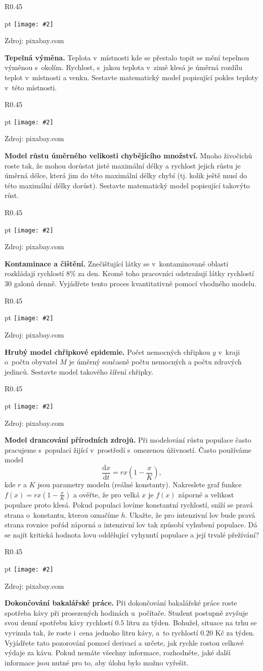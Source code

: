\documentclass{article}
\newcommand\obrazek[2][pixabay.com]{
  \clearpage
\begin{wrapfigure}{R}{0.45\linewidth}
  \begin{minipage}{1.0\linewidth}\parskip 0 pt
  \texttt{[image: \#2]}

  \vspace*{-10pt}
  \null\hfill{\color{gray}\footnotesize Zdroj: #1}
    
  \end{minipage}
\end{wrapfigure}
}
\let\oldtextbf\textbf
\def\textbf#1{%
  \oldtextbf{\color{red} #1}}
\begin{document}
\obrazek{room.jpg}
\textbf{Tepelná výměna.}  Teplota v místnosti kde se přestalo topit se mění
tepelnou výměnou s okolím. Rychlost, s jakou teplota v zimě klesá je
úměrná rozdílu teplot v místnosti a venku. Sestavte matematický model
popisující pokles teploty v této místnosti.


\obrazek{mladata.jpg}
\textbf{Model růstu úměrného velikosti chybějícího množství.}  Mnoho
živočichů roste tak, že mohou dorůstat jisté maximální délky a
rychlost jejich růstu je úměrná délce, která jim do této maximální
délky chybí (tj. kolik ještě musí do této maximální délky
dorůst). Sestavte matematický model popisující takovýto růst.


\obrazek{kontaminace.jpg}
\textbf{Kontaminace a čištění.}
Znečišťující látky se v kontaminované oblasti rozkládají rychlostí
$8\%$ za den. Kromě toho pracovníci odstraňují látky rychlostí $30$
galonů denně. Vyjádřete tento proces kvantitativně pomocí vhodného
modelu.

\obrazek{nemoc.jpg} \textbf{Hrubý model chřipkové epidemie.}  Počet
nemocných chřipkou $y$ v kraji o počtu obyvatel $M$ je úměrný současně
počtu nemocných a počtu zdravých jedinců. Sestavte model takového
šíření chřipky.


\obrazek{lov.jpg}
\textbf{Model drancování přírodních zdrojů.}
Při modelování růstu populace často pracujeme s populací žijící v prostředí s omezenou úživností. Často používáme model
$$\frac{\mathrm d x}{\mathrm dt}=rx\left(1-\frac xK\right),$$
kde $r$ a $K$ jsou parametry modelu (reálné konstanty).  Nakreslete
graf funkce $f(x)=rx\left(1-\frac xK\right)$ a ověřte, že pro velká
$x$ je $f(x)$ záporné a velikost populace proto klesá. Pokud populaci
lovíme konstantní rychlostí, sníží se pravá strana o konstantu, kterou
označíme $h$. Ukažte, že pro intenzivní lov bude pravá strana rovnice
pořád záporná a intenzivní lov tak způsobí vyhubení populace. Dá se
najít kritická hodnota lovu oddělující vyhynutí populace a její
trvalé přežívání?

\obrazek{kafe.jpg}
\textbf{Dokončování bakalářské práce.} Při dokončování bakalářské
práce roste spotřeba kávy při prosezených hodinách u počítače. Student
postupně zvyšuje svou denní spotřebu kávy rychlostí $0.5$ litru za
týden. Bohužel, situace na trhu se vyvinula tak, že roste i cena
jednoho litru kávy, a to rychlostí $0.20$ Kč za týden. Vyjádřete tato
pozorování pomocí derivací a určete, jak rychle rostou celkové výdaje
za kávu. Pokud nemáte všechny informace, rozhodněte, jaké další
informace jsou nutné pro to, aby úlohu bylo možno vyřešit.
\end{document}
